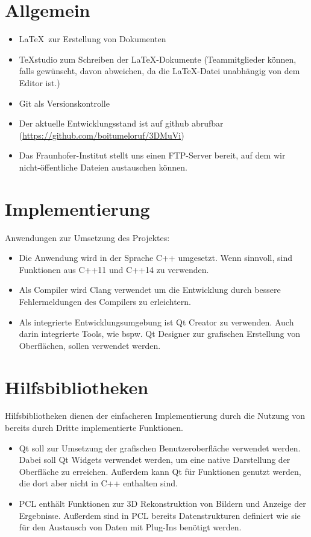 
\section{Allgemein}
	\begin{itemize}
		\item \LaTeX\ zur Erstellung von Dokumenten
		\item TeXstudio zum Schreiben der \LaTeX-Dokumente (Teammitglieder können, falls gewünscht, davon abweichen, da die \LaTeX-Datei unabhängig von dem Editor ist.)
		\item Git als Versionskontrolle
		\item Der aktuelle Entwicklungsstand ist auf github abrufbar
		\newline(\href{https://github.com/boitumeloruf/3DMuVi}{https://github.com/boitumeloruf/3DMuVi})
		\item Das Fraunhofer-Institut stellt uns einen FTP-Server bereit, auf dem wir nicht-öffentliche Dateien austauschen können.
	\end{itemize}
\section{Implementierung}
	Anwendungen zur Umsetzung des Projektes:
	\begin{itemize}
		\item Die Anwendung wird in der Sprache C++ umgesetzt. Wenn sinnvoll, sind Funktionen aus C++11 und C++14 zu verwenden.
		\item Als Compiler wird Clang verwendet um die Entwicklung durch bessere Fehlermeldungen des Compilers zu erleichtern.
		\item Als integrierte Entwicklungsumgebung ist Qt Creator zu verwenden. Auch darin integrierte Tools, wie bspw. Qt Designer zur grafischen Erstellung von Oberflächen, sollen verwendet werden.
	\end{itemize}
\section{Hilfsbibliotheken}
	Hilfsbibliotheken dienen der einfacheren Implementierung durch die Nutzung von bereits durch Dritte implementierte Funktionen.
	\begin{itemize}
		\item Qt soll zur Umsetzung der grafischen Benutzeroberfläche verwendet werden. Dabei soll Qt Widgets verwendet werden, um eine native Darstellung der Oberfläche zu erreichen. Außerdem kann Qt für Funktionen genutzt werden, die dort aber nicht in C++ enthalten sind.
		\item PCL enthält Funktionen zur 3D Rekonstruktion von Bildern und Anzeige der Ergebnisse. Außerdem sind in PCL bereits Datenstrukturen definiert wie sie für den Austausch von Daten mit Plug-Ins benötigt werden.
	\end{itemize}
